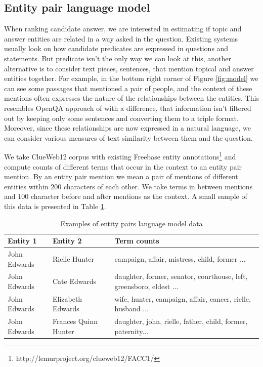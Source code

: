 \subsection{Entity pair language model}
\label{section:method:clueweb}

When ranking candidate answer, we are interested in estimating if topic and answer entities are related in a way asked in the question.
Existing systems usually look on how candidate predicates are expressed in questions and statements.
But predicate isn't the only way we can look at this, another alternative is to consider text pieces, \eg sentences, that mention topical and answer entities together.
For example, in the bottom right corner of Figure \ref{fig:model} we can see some passages that mentioned a pair of people, and the context of these mentions often expresses the nature of the relationships between the entities.
This resembles OpenQA approach of \cite{Fader:2014:OQA:2623330.2623677} with a difference, that information isn't filtered out by keeping only some sentences and converting them to a triple format.
Moreover, since these relationships are now expressed in a natural language, we can consider various measures of text similarity between them and the question.

We take ClueWeb12 corpus with existing Freebase entity annotations\footnote{http://lemurproject.org/clueweb12/FACC1/} and compute counts of different terms that occur in the context to an entity pair mention.
By an entity pair mention we mean a pair of mentions of different entities within 200 characters of each other.
We take terms in between mentions and 100 character before and after mentions as the context.
A small sample of this data is presented in Table \ref{table:clueweb_entitypairs_langmodel}.

\begin{table}
\caption{Examples of entity pairs language model data}
\label{table:clueweb_entitypairs_langmodel}
\begin{tabular}{| p{1.25cm} | p{1.23cm} | p{4.5cm} |}
\hline
Entity 1 & Entity 2 & Term counts\\
\hline
John Edwards & Rielle Hunter & campaign, affair, mistress, child, former ...\\
\hline
John Edwards & Cate Edwards & daughter, former, senator, courthouse, left, greensboro, eldest ...\\
\hline
John Edwards & Elizabeth Edwards & wife, hunter, campaign, affair, cancer, rielle, husband ...\\
\hline
John Edwards & Frances Quinn Hunter & daughter, john, rielle, father, child, former, paternity...\\
\hline
\end{tabular}
\end{table}

